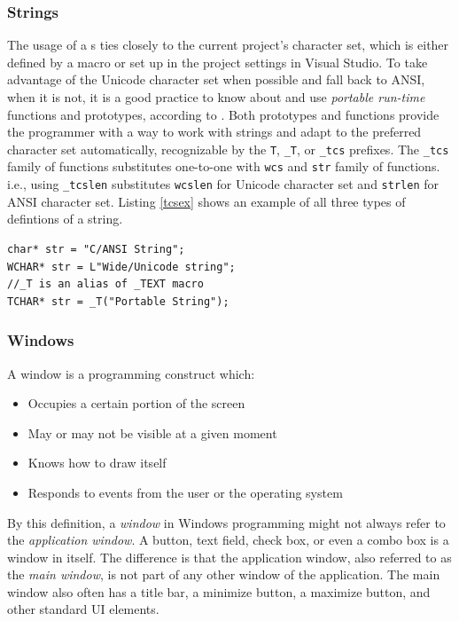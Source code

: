 \subsubsection{Strings}
The usage of a s ties closely to the current project's character set, which is either defined by a macro or set up in the project settings in Visual Studio. To take advantage of the Unicode character set when possible and fall back to ANSI, when it is not, it is a good practice to know about and use \textit{portable run-time} functions and prototypes, according to \cite{WinUnicodeSummary}. Both prototypes and functions provide the programmer with a way to work with strings and adapt to the preferred character set automatically, recognizable by the \lstinline{T}, \lstinline{_T}, or \lstinline{_tcs} prefixes. The \lstinline{_tcs} family of functions substitutes one-to-one with \lstinline{wcs} and \lstinline{str} family of functions. i.e., using \lstinline{_tcslen} substitutes \lstinline{wcslen} for Unicode character set and \lstinline{strlen} for ANSI character set. Listing \ref{tcsex} shows an example of all three types of defintions of a string.
\begin{lstlisting}[caption={An example of defining static strings}, label=tcsex]
char* str = "C/ANSI String";
WCHAR* str = L"Wide/Unicode string";
//_T is an alias of _TEXT macro
TCHAR* str = _T("Portable String");
\end{lstlisting}

\subsubsection{Windows}
\label{ch2Windows}
A window is a programming construct which:
\begin{itemize}
    \item Occupies a certain portion of the screen
    \item May or may not be visible at a given moment
    \item Knows how to draw itself
    \item Responds to events from the user or the operating system
\end{itemize}

By this definition, a \textit{window} in Windows programming might not always refer to the \textit{application window}. A button, text field, check box, or even a combo box is a window in itself. The difference is that the application window, also referred to as the \textit{main window}, is not part of any other window of the application. The main window also often has a title bar, a minimize button, a maximize button, and other standard UI elements.

